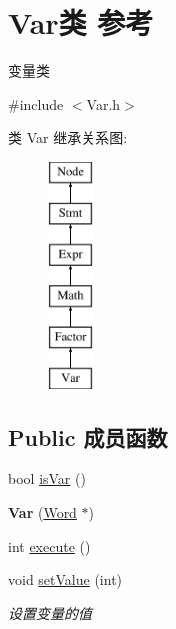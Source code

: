 \hypertarget{class_var}{}\section{Var类 参考}
\label{class_var}


变量类  




{\ttfamily \#include $<$Var.\+h$>$}

类 Var 继承关系图\+:\begin{figure}[H]
\begin{center}
\leavevmode
\includegraphics[height=6.000000cm]{class_var}
\end{center}
\end{figure}
\subsection*{Public 成员函数}
\begin{DoxyCompactItemize}
\item 
bool \hyperlink{class_var_a50aa6f54310903a8bc36184813a2b9ef}{is\+Var} ()
\item 
{\bfseries Var} (\hyperlink{class_word}{Word} $\ast$)\hypertarget{class_var_ab111df39c1575d7ba1f96f3b89574b8c}{}\label{class_var_ab111df39c1575d7ba1f96f3b89574b8c}

\item 
int \hyperlink{class_var_a9dc96e803f7b0f9aa519c2c0e0a6bd8f}{execute} ()
\item 
void \hyperlink{class_var_af0f42d31f5001ff4d4781b9ba199a612}{set\+Value} (int)\hypertarget{class_var_af0f42d31f5001ff4d4781b9ba199a612}{}\label{class_var_af0f42d31f5001ff4d4781b9ba199a612}

\begin{DoxyCompactList}\small\item\em 设置变量的值 \end{DoxyCompactList}\end{DoxyCompactItemize}
